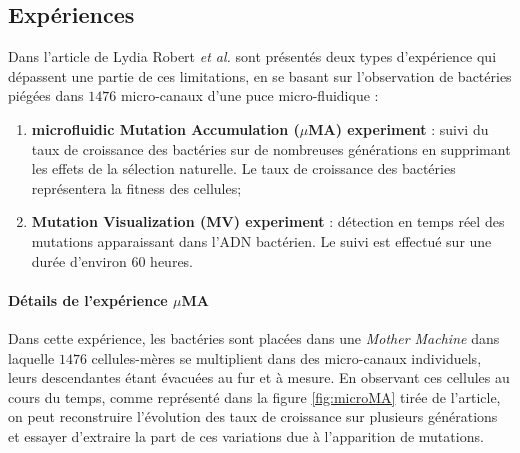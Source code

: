 \documentclass[12pt]{article}
\begin{document}
\subsection{Expériences}

Dans l'article de Lydia Robert \textit{et al.} \cite{rob} sont présentés deux types d'expérience qui dépassent une partie de ces limitations, en se basant sur l'observation de bactéries piégées dans $1476$ micro-canaux d'une puce micro-fluidique :
\begin{enumerate}
\item \textbf{microfluidic Mutation Accumulation ($\mu$MA) experiment} : suivi du taux de croissance des bactéries sur de nombreuses générations en supprimant les effets de la sélection naturelle. Le taux de croissance des bactéries représentera la fitness des cellules;
\item \textbf{Mutation Visualization (MV) experiment} : détection en temps réel des mutations apparaissant dans l'ADN bactérien. Le suivi est effectué sur une durée d'environ $60$ heures.
\end{enumerate}



\paragraph{Détails de l'expérience $\mu$MA}

Dans cette expérience, les bactéries sont placées dans une \emph{Mother Machine} dans laquelle $1476$ cellules-mères se multiplient dans des micro-canaux individuels, leurs descendantes étant évacuées au fur et à mesure. En observant ces cellules au cours du temps, comme représenté dans la figure \ref{fig:microMA} tirée de l'article, on peut reconstruire l'évolution des taux de croissance sur plusieurs générations et essayer d'extraire la part de ces variations due à l'apparition de mutations.
\end{document}
